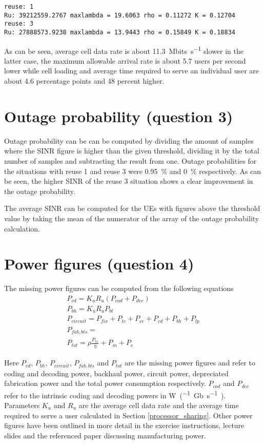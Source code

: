 \documentclass{article}
\begin{document}
\texttt{reuse: 1 \\
Ru: 39212559.2767 maxlambda = 19.6063 rho = 0.11272 K = 0.12704 \\
reuse: 3 \\
Ru: 27888573.9238 maxlambda = 13.9443 rho = 0.15849 K = 0.18834}

As can be seen, average cell data rate is about \SI{11.3}{Mbits\per \second} slower in the latter case, the maximum allowable arrival rate is about 5.7 users per second lower while cell loading and average time required to serve an individual user are about 4.6 percentage points and 48 percent higher.

\section{Outage probability (question 3)}

Outage probability can be can be computed by dividing the amount of samples where the SINR figure is higher than the given threshold, dividing it by the total number of samples and subtracting the result from one. Outage probabilities for the situations with reuse 1 and reuse 3 were 0.95\ \% and 0\ \% respectively. As can be seen, the higher SINR of the reuse 3 situation shows a clear improvement in the outage probability.

The average SINR can be computed for the UEs with figures above the threshold value by taking the mean of the numerator of the array of the outage probability calculation.

\section{Power figures (question 4)}
The missing power figures can be computed from the following equations
\begin{gather*}
    P_{cd} = K_u R_u (P_{cod} + P_{dec}) \\
    P_{bh} = K_u R_u P_{bt} \\
    P_{circuit} = P_{fix} + P_{tc} + P_{ce} + P_{cd} + P_{bh} + P_{lp} \\
    P_{fab,bts} = \\
    P_{tot} =\rho \frac{P_{tx}}{\eta} + P_{m} + P_{c}
\end{gather*}

Here \(P_{cd}\), \(P_{bh}\), \(P_{circuit}\), \(P_{fab,bts}\) and \(P_{tot}\) are the missing power figures and refer to coding and decoding power, backhaul power, circuit power, depreciated fabrication power and the total power consumption respectively. \(P_{cod}\) and \(P_{dec}\) refer to the intrinsic coding and decoding powers in \si{\watt\per(\giga b\per\second)}. Parameters \(K_u\) and \(R_u\) are the average cell data rate and the average time required to serve a user calculated in Section \ref{processor_sharing}. Other power figures have been outlined in more detail in the exercise instructions, lecture slides and the referenced paper discussing manufacturing power.
\end{document}
